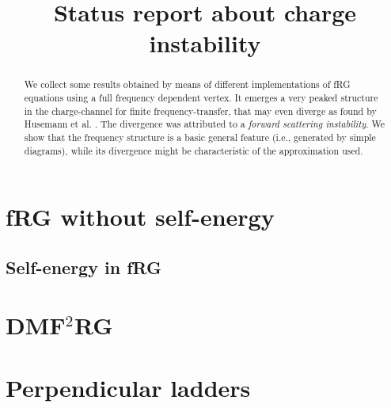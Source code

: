\documentclass[a4paper,11pt]{article}
\begin{document}
\title{Status report about charge instability}

\maketitle 







\begin{abstract}

We collect some results obtained by means of different implementations of fRG equations using a full frequency dependent vertex. 
It emerges a very peaked structure in the charge-channel for finite frequency-transfer, that may even diverge as found by Husemann et al.  \cite{Husemann2012}. The divergence was attributed to a \emph{forward scattering instability}. 
We show that the frequency structure is a basic general feature (i.e., generated by simple diagrams), while its divergence might be characteristic of the approximation used.   

\end{abstract}

\maketitle

\section{fRG without self-energy} 				
\label{sec:frgnoself}
  

\subsection{Self-energy in fRG}				
\label{sec:frgself}



\section{DMF$^2$RG }	
\label{sec:dmf2rgnoself}


\section{Perpendicular ladders}				
\label{sec:perpendciular}



  
\end{document}
